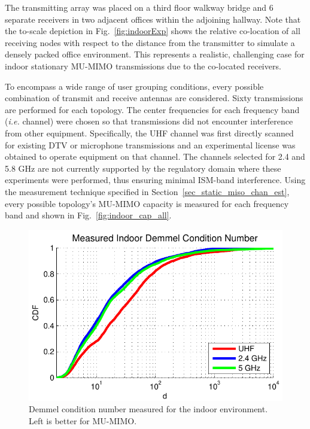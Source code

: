 The \hspace{0.01pt} transmitting \hspace{0.01pt} array\hspace{0.01pt}  was \hspace{0.01pt}  placed \hspace{0.01pt} on \hspace{0.01pt} a \hspace{0.01pt} third \hspace{0.01pt} floor \hspace{0.01pt} walkway bridge and 6 separate receivers in two adjacent offices within the adjoining hallway.
Note that the to-scale depiction in Fig.~\ref{fig:indoorExp} shows the relative co-location of all receiving nodes with respect to the distance from the transmitter to simulate a densely packed office environment.
This represents a realistic, challenging case for indoor stationary MU-MIMO transmissions due to the co-located receivers.

To encompass a wide range of user grouping conditions, every possible combination of transmit and receive antennas are considered. Sixty transmissions are performed for each topology. The center frequencies for each frequency band (\textit{i.e.} channel) were chosen so that transmissions did not encounter interference from other equipment. Specifically, the UHF channel was first directly scanned for existing DTV or microphone transmissions and an experimental license was obtained to operate equipment on that channel. The channels selected for 2.4 and 5.8 GHz are not currently supported by the regulatory domain where these experiments were performed, thus ensuring minimal ISM-band interference.
	Using the measurement technique specified in Section~\ref{sec_static_miso_chan_est}, every possible topology's MU-MIMO capacity is measured for each frequency band and shown in Fig.~\ref{fig:indoor_cap_all}.



\begin{figure}[th]
		\centering  
	\includegraphics[width=0.7\linewidth]{figs/meas_indoor_dcond} 
    	\caption{Demmel condition number measured for the indoor environment. Left is better for \ac{MU-MIMO}.
	\label{fig:indoor_demmel}}
\end{figure}


